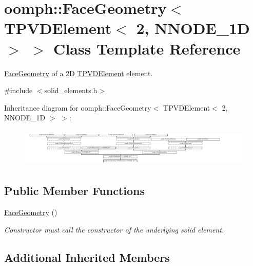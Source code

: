 \hypertarget{classoomph_1_1FaceGeometry_3_01TPVDElement_3_012_00_01NNODE__1D_01_4_01_4}{}\section{oomph\+:\+:Face\+Geometry$<$ T\+P\+V\+D\+Element$<$ 2, N\+N\+O\+D\+E\+\_\+1D $>$ $>$ Class Template Reference}
\label{classoomph_1_1FaceGeometry_3_01TPVDElement_3_012_00_01NNODE__1D_01_4_01_4}


\hyperlink{classoomph_1_1FaceGeometry}{Face\+Geometry} of a 2D \hyperlink{classoomph_1_1TPVDElement}{T\+P\+V\+D\+Element} element.  




{\ttfamily \#include $<$solid\+\_\+elements.\+h$>$}

Inheritance diagram for oomph\+:\+:Face\+Geometry$<$ T\+P\+V\+D\+Element$<$ 2, N\+N\+O\+D\+E\+\_\+1D $>$ $>$\+:\begin{figure}[H]
\begin{center}
\leavevmode
\includegraphics[height=1.840375cm]{classoomph_1_1FaceGeometry_3_01TPVDElement_3_012_00_01NNODE__1D_01_4_01_4}
\end{center}
\end{figure}
\subsection*{Public Member Functions}
\begin{DoxyCompactItemize}
\item 
\hyperlink{classoomph_1_1FaceGeometry_3_01TPVDElement_3_012_00_01NNODE__1D_01_4_01_4_a22440667c020defb3a91671020147892}{Face\+Geometry} ()
\begin{DoxyCompactList}\small\item\em Constructor must call the constructor of the underlying solid element. \end{DoxyCompactList}\end{DoxyCompactItemize}
\subsection*{Additional Inherited Members}



